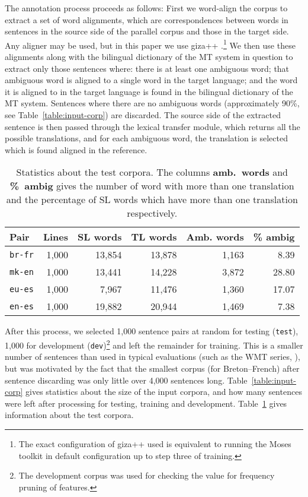 \documentclass[11pt]{article}
\begin{document}
The annotation process proceeds as follows: First we word-align the
corpus to extract a set of word alignments, which are correspondences
between words in sentences in the source side of the parallel corpus
and those in the target side. Any aligner may be used, but in this
paper we use {\sc giza++} \citep{och03a}.\footnote{The exact
  configuration of {\sc giza++} used is equivalent to running the {\sc
    Moses} toolkit \citep{koehn07} in default configuration up to step
  three of training.}  We then use
these alignments along with the bilingual dictionary of the MT system
in question to extract only those sentences where: there is at least
one ambiguous word; that ambiguous word is aligned to a single word in
the target language; and the word it is aligned to in the target
language is found in the bilingual dictionary of the MT
system. Sentences where there are no ambiguous words (approximately
90\%, see Table~\ref{table:input-corp}) are discarded. The source side
of the extracted sentence is then passed through the lexical transfer
module, which returns all the possible translations, and for each
ambiguous word, the translation is selected which is found aligned in
the reference.

\begin{table}
\begin{center}
 \begin{tabular}{|l|r|r|r|r|r|}
    \hline 
    {\bf Pair}      & {\bf Lines} & {\bf SL words} & {\bf TL words} & {\bf Amb. words} & {\bf \% ambig} \\ 
    \hline 
     \texttt{br-fr} & 1,000 & 13,854  & 13,878  & 1,163 & 8.39   \\
    \hline 
     \texttt{mk-en} & 1,000 & 13,441 & 14,228  & 3,872 & 28.80 \\
    \hline 
     \texttt{eu-es} & 1,000 & 7,967 & 11,476  & 1,360  & 17.07 \\
    \hline 
     \texttt{en-es} & 1,000 & 19,882 & 20,944  & 1,469  & 7.38 \\
    \hline 
 \end{tabular} 
\end{center}
 \caption{Statistics about the test corpora. The columns \textbf{amb.\ words} and \textbf{\%~ambig} gives 
    the number of word with more than one translation and the percentage of SL words which have 
    more than one translation respectively.}
  \label{table:test-corp}
\end{table}

After this process, we selected 1,000 sentence pairs at random for
testing (\texttt{test}), 1,000 for development (\texttt{dev})\footnote{The development corpus  
  was used for checking the value for frequency pruning of features.} and 
left the remainder for training. This is a smaller
number of sentences than used in typical evaluations (such as the WMT
series, \cite{callisonburch2012}), but was motivated by the fact that
the smallest corpus (for Breton--French) after sentence discarding was
only little over 4,000 sentences long. Table~\ref{table:input-corp}
gives statistics about the size of the input corpora, and how many
sentences were left after processing for testing, training and
development. Table~\ref{table:test-corp} gives information about the
test corpora.
\end{document}
